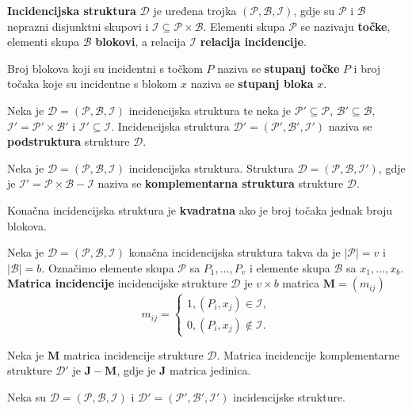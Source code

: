 \textbf{Incidencijska struktura} $\mathcal{D}$ je uređena trojka
$(\mathcal{P}, \mathcal{B}, \mathcal{I})$, gdje su
$\mathcal{P}$ i $\mathcal{B}$ neprazni disjunktni skupovi i
$\mathcal{I} \subseteq \mathcal{P} \times \mathcal{B}$.
Elementi skupa $\mathcal{P}$ se nazivaju \textbf{točke}, elementi skupa
$\mathcal{B}$ \textbf{blokovi}, a relacija $\mathcal{I}$
\textbf{relacija incidencije}.

Broj blokova koji su incidentni s točkom $P$ naziva se \textbf{stupanj točke}
$P$ i broj točaka koje su incidentne s blokom $x$ naziva se
\textbf{stupanj bloka} $x$.

\bigskip
\noindent
Neka je $\mathcal{D} = (\mathcal{P}, \mathcal{B}, \mathcal{I})$ incidencijska
struktura te neka je $\mathcal{P}' \subseteq \mathcal{P}$,
$\mathcal{B}' \subseteq \mathcal{B}$,
$\mathcal{I}' = \mathcal{P}' \times \mathcal{B}'$ i
$\mathcal{I}' \subseteq \mathcal{I}$. Incidencijska struktura
$\mathcal{D}' = (\mathcal{P}', \mathcal{B}', \mathcal{I}')$ naziva se
\textbf{podstruktura} strukture $\mathcal{D}$.

\smallskip
\noindent
Neka je $\mathcal{D} = (\mathcal{P}, \mathcal{B}, \mathcal{I})$ incidencijska
struktura. Struktura $\mathcal{D} = (\mathcal{P}, \mathcal{B}, \mathcal{I}')$,
gdje je $\mathcal{I}' = \mathcal{P} \times \mathcal{B} - \mathcal{I}$ naziva se
\textbf{komplementarna struktura} strukture $\mathcal{D}$.

\smallskip
\noindent
Konačna incidencijska struktura je \textbf{kvadratna} ako je broj točaka jednak
broju blokova.

\bigskip
\noindent
Neka je $\mathcal{D} = (\mathcal{P}, \mathcal{B}, \mathcal{I})$ konačna
incidencijska struktura takva da je $|\mathcal{P}| = v$ i $|\mathcal{B}| = b$.
Označimo elemente skupa $\mathcal{P}$ sa $P_1, \dots, P_v$ i elemente skupa
$\mathcal{B}$ sa $x_1, \dots, x_b$. \textbf{Matrica incidencije} incidencijske
strukture $\mathcal{D}$ je $v \times b$ matrica $\mathbf{M} = (m_{ij})$
$$
m_{ij} = \begin{cases*}
    1, (P_i, x_j) \in \mathcal{I},\\
    0, (P_i, x_j) \notin \mathcal{I}.
\end{cases*}
$$

\noindent
Neka je $\mathbf{M}$ matrica incidencije strukture $\mathcal{D}$. Matrica
incidencije komplementarne strukture $\mathcal{D}'$ je
$\mathbf{J} - \mathbf{M}$, gdje je $\mathbf{J}$ matrica jedinica.

\bigskip
\noindent
Neka su $\mathcal{D} = (\mathcal{P}, \mathcal{B}, \mathcal{I})$ i
$\mathcal{D}' = (\mathcal{P}', \mathcal{B}', \mathcal{I}')$ incidencijske
strukture.


